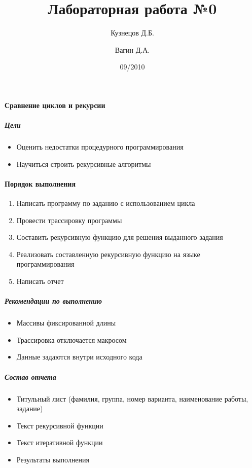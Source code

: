 \documentclass[a4paper,12pt]{article}
\title{Лабораторная работа №0}
\author{Кузнецов Д.Б.\and Вагин Д.А.}
\date{09/2010}
\begin{document}

\paragraph{Сравнение циклов и рекурсии}
\subparagraph{Цели}
\begin{itemize}
	\item Оценить недостатки процедурного программирования
	\item Научиться строить рекурсивные алгоритмы
\end{itemize}

\paragraph{Порядок выполнения}
\begin{enumerate}
	\item Написать программу по заданию с использованием цикла
	\item Провести трассировку программы
	\item Составить рекурсивную функцию для решения выданного задания
	\item Реализовать составленную рекурсивную функцию на языке программирования
	\item Написать отчет
\end{enumerate}

\subparagraph{Рекомендации по выполнению}
\begin{itemize}
	\item Массивы фиксированной длины
	\item Трассировка отключается макросом
	\item Данные задаются внутри исходного кода
\end{itemize}

\subparagraph{Состав отчета}
\begin{itemize}
	\item Титульный лист (фамилия, группа, номер варианта, наименование работы, задание)
	\item Текст рекурсивной функции
	\item Текст итеративной функции
	\item Результаты выполнения
\end{itemize}
\end{document}
